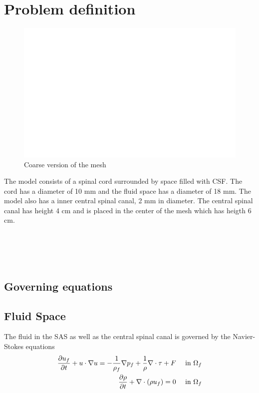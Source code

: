 \section{Problem definition}
\begin{figure}
	\vspace{-60pt}
	\begin{center}
		\includegraphics[scale=0.2]{mesh}
	\end{center}
	\vspace{-20pt}
	\caption{Coarse version of the mesh}
	\vspace{-10pt}
\end{figure}
The model consists of a spinal cord surrounded by space filled with CSF. The cord has a diameter of 10 mm and the fluid space has a diameter of 18 mm. The model also has a inner central spinal canal, 2 mm in diameter. The central spinal canal has height 4 cm and is placed in the center of the mesh which has heigth 6 cm.
\\
\\
\\
\\
\\



\subsection{Governing equations}



\subsection*{Fluid Space}
The fluid in the SAS as well as the central spinal canal is governed by the Navier-Stokes equations
\begin{align}
	\frac{\partial u_f}{\partial t} + u\cdot \nabla u = -\frac{1}{\rho_f}\nabla p_f + \frac{1}{\rho} \nabla \cdot 		\tau + F&& \text{ in } \Omega_f 
	\\
	\frac{\partial \rho}{\partial t} +\nabla \cdot(\rho u_f) = 0 && \text{ in } \Omega_f
\end{align}

